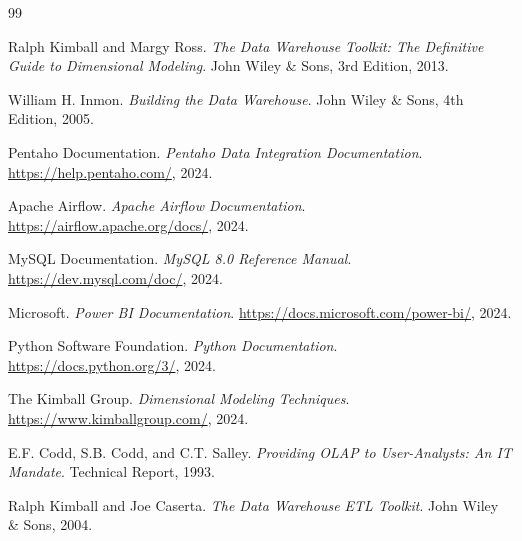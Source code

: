 \documentclass[12pt,a4paper]{report}
\begin{document}
\vspace{2cm}


\cleardoublepage


\begin{thebibliography}{99}

Ralph Kimball and Margy Ross. 
\textit{The Data Warehouse Toolkit: The Definitive Guide to Dimensional Modeling}. 
John Wiley \& Sons, 3rd Edition, 2013.

William H. Inmon. 
\textit{Building the Data Warehouse}. 
John Wiley \& Sons, 4th Edition, 2005.

Pentaho Documentation. 
\textit{Pentaho Data Integration Documentation}. 
\url{https://help.pentaho.com/}, 2024.

Apache Airflow. 
\textit{Apache Airflow Documentation}. 
\url{https://airflow.apache.org/docs/}, 2024.

MySQL Documentation. 
\textit{MySQL 8.0 Reference Manual}. 
\url{https://dev.mysql.com/doc/}, 2024.

Microsoft. 
\textit{Power BI Documentation}. 
\url{https://docs.microsoft.com/power-bi/}, 2024.

Python Software Foundation. 
\textit{Python Documentation}. 
\url{https://docs.python.org/3/}, 2024.

The Kimball Group. 
\textit{Dimensional Modeling Techniques}. 
\url{https://www.kimballgroup.com/}, 2024.

E.F. Codd, S.B. Codd, and C.T. Salley. 
\textit{Providing OLAP to User-Analysts: An IT Mandate}. 
Technical Report, 1993.

Ralph Kimball and Joe Caserta. 
\textit{The Data Warehouse ETL Toolkit}. 
John Wiley \& Sons, 2004.

\end{thebibliography}
\end{document}
